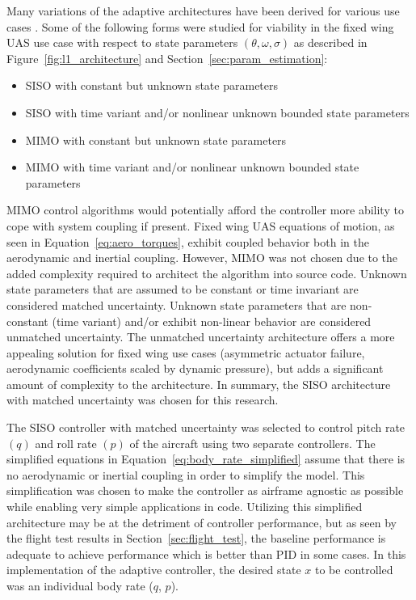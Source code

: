 Many variations of the \Lone adaptive architectures have been derived for various use cases \cite{hovakimyan2010l1}.  Some of the following forms were studied for viability in the fixed wing \ac{UAS} use case with respect to state parameters $(\theta, \omega, \sigma)$ as described in Figure~\ref{fig:l1_architecture} and Section~\ref{sec:param_estimation}:
\begin{itemize}
 \item \ac{SISO} with constant but unknown state parameters
 \item \ac{SISO} with time variant and/or nonlinear unknown bounded state parameters
 \item \ac{MIMO} with constant but unknown state parameters 
 \item \ac{MIMO} with time variant and/or nonlinear unknown bounded state parameters
\end{itemize}

\ac{MIMO} control algorithms would potentially afford the controller more ability to cope with system coupling if present.  Fixed wing \ac{UAS} equations of motion, as seen in Equation~\ref{eq:aero_torques}, exhibit coupled behavior both in the aerodynamic and inertial coupling.  However, \ac{MIMO} was not chosen due to the added complexity required to architect the algorithm into source code.  Unknown state parameters that are assumed to be constant or time invariant are considered matched uncertainty.  Unknown state parameters that are non-constant (time variant) and/or exhibit non-linear behavior are considered unmatched uncertainty.  The unmatched uncertainty architecture offers a more appealing solution for fixed wing use cases (asymmetric actuator failure, aerodynamic coefficients scaled by dynamic pressure), but adds a significant amount of complexity to the architecture.  In summary, the \ac{SISO} architecture with matched uncertainty was chosen for this research.  

The \ac{SISO} controller with matched uncertainty was selected to control pitch rate $(q)$ and roll rate $(p)$ of the aircraft using two separate controllers.  The simplified equations in Equation~\ref{eq:body_rate_simplified} assume that there is no aerodynamic or inertial coupling in order to simplify the model.  This simplification was chosen to make the controller as airframe agnostic as possible while enabling very simple applications in code.  Utilizing this simplified architecture may be at the detriment of controller performance, but as seen by the flight test results in Section~\ref{sec:flight_test}, the baseline performance is adequate to achieve performance which is better than \ac{PID} in some cases.  In this implementation of the \Lone adaptive controller, the desired state $x$ to be controlled was an individual body rate (\eg $q$, $p$). 

